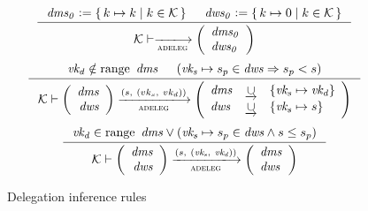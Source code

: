\begin{figure}[htb]
  \begin{equation}
    \label{eq:adeleg-bootstrap}
    \inference
    {
      \var{dms_0} \leteq \Set{k \mapsto k}{k \in \mathcal{K}} &
      \var{dws_0} \leteq \Set{k \mapsto 0}{k \in \mathcal{K}}
    }
    {
      \mathcal{K}
      \vdash
      \trans{adeleg}{}
      \left(
        \begin{array}{l}
          \var{dms_0}\\
          \var{dws_0}
        \end{array}
      \right)
    }
  \end{equation}
  \nextdef
  \begin{equation}\label{eq:rule:delegation-change}
    \inference
    {
      \var{vk_d} \notin \range~\var{dms} & (\var{vk_s} \mapsto s_p \in \var{dws} \Rightarrow s_p < s)
    }
    {
      \mathcal{K}
      \vdash
      \left(
      \begin{array}{r}
        \var{dms}\\
        \var{dws}
      \end{array}
      \right)
      \trans{adeleg}{(s,~ (vk_s,~ vk_d))}
      \left(
      \begin{array}{lcl}
        \var{dms} & \unionoverrideRight & \{\var{vk_s} \mapsto \var{vk_d}\}\\
        \var{dws} & \unionoverrideRight & \{\var{vk_s} \mapsto s \}
      \end{array}
      \right)
    }
  \end{equation}
  \nextdef
  \begin{equation}\label{eq:rule:delegation-nop}
    \inference
    {\var{vk_d} \in \range~\var{dms} \vee (\var{vk_s} \mapsto s_p  \in \var{dws}  \wedge s \leq s_p)
    }
    {
      \mathcal{K}
      \vdash
      \left(
      \begin{array}{r}
        \var{dms}\\
        \var{dws}
      \end{array}
      \right)
      \trans{adeleg}{(s,~ (\var{vk_s},~ \var{vk_d}))}
      \left(
      \begin{array}{lcl}
        \var{dms}\\
        \var{dws}
      \end{array}
      \right)
    }
  \end{equation}
  \caption{Delegation inference rules}
  \label{fig:rules:delegation}
\end{figure}

\clearpage

